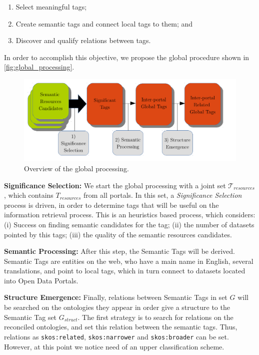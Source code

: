 \begin{enumerate}
	\item Select meaningful tags;
	\item Create semantic tags and connect local tags to them; and
	\item Discover and qualify relations between tags.
\end{enumerate}

In order to accomplish this objective, we propose the global procedure shown in \autoref{fig:global_processing}.

\begin{figure}[tb]
\begin{center}
\includegraphics[width=\columnwidth]{images/global_processing.pdf}
\caption[Overview of the global processing.]{Overview of the global processing.}
\label{fig:global_processing}
\end{center}
\end{figure}

\noindent \textbf{Significance Selection: } We start the global processing with a joint set $\mathcal{T}_{resources}$, which contains $T_{resources}$ from all portals. 
In this set, a \emph{Significance Selection} process is driven, in order to determine tags that will be useful on the information retrieval process.
This is an heuristics based process, which considers: (i) Success on finding semantic candidates for the tag; (ii) the number of datasets pointed by this tags; (iii) the quality of the semantic resources candidates.

\noindent \textbf{Semantic Processing:} After this step, the Semantic Tags will be derived.
Semantic Tags are entities on the web, who have a main name in English, several translations, and point to local tags, which in turn connect to datasets located into Open Data Portals.

\noindent \textbf{Structure Emergence:} Finally, relations between Semantic Tags in set $G$ will be searched on the ontologies they appear in order give a structure to the Semantic Tag set $G_{struct}$.
The first strategy is to search for relations on the reconciled ontologies, and set this relation between the semantic tags.
Thus, relations as \texttt{skos:related}, \texttt{skos:narrower} and \texttt{skos:broader} can be set.
However, at this point we notice need of an upper classification scheme.

